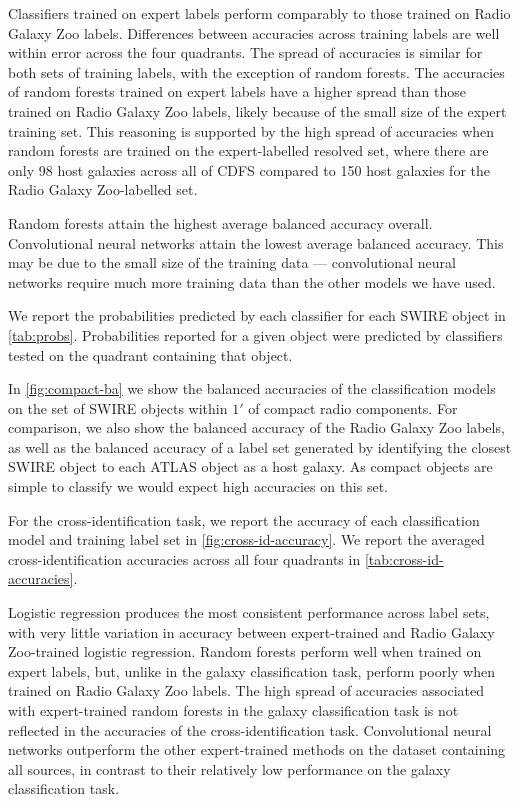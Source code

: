 \documentclass[fleqn,usenatbib,usedcolumn]{mnras}
\begin{document}
    Classifiers trained on expert labels perform comparably to those trained
    on Radio Galaxy Zoo labels. Differences between accuracies across training
    labels are well within error across the four quadrants. The spread of
    accuracies is similar for both sets of training labels, with the exception
    of random forests. The accuracies of random forests trained on expert
    labels have a higher spread than those trained on Radio Galaxy Zoo labels,
    likely because of the small size of the expert training set. This
    reasoning is supported by the high spread of accuracies when random
    forests are trained on the expert-labelled resolved set, where there are
    only 98 host galaxies across all of CDFS compared to 150 host galaxies for
    the Radio Galaxy Zoo-labelled set.

    Random forests attain the highest average balanced accuracy overall.
    Convolutional neural networks attain the lowest average balanced accuracy.
    This may be due to the small size of the training data --- convolutional
    neural networks require much more training data than the other models we
    have used.

    We report the probabilities predicted by each classifier for each SWIRE
    object in \autoref{tab:probs}. Probabilities reported for a given object
    were predicted by classifiers tested on the quadrant containing that
    object.

    In \autoref{fig:compact-ba} we show the balanced accuracies of the
    classification models on the set of SWIRE objects within $1'$ of compact
    radio components. For comparison, we also show the balanced accuracy of
    the Radio Galaxy Zoo labels, as well as the balanced accuracy of a label
    set generated by identifying the closest SWIRE object to each ATLAS object
    as a host galaxy. As compact objects are simple to classify we would
    expect high accuracies on this set.

    For the cross-identification task, we report the accuracy of each
    classification model and training label set in
    \autoref{fig:cross-id-accuracy}. We report the averaged
    cross-identification accuracies across all four quadrants in
    \autoref{tab:cross-id-accuracies}.

    Logistic regression produces the most consistent performance across label
    sets, with very little variation in accuracy between expert-trained and
    Radio Galaxy Zoo-trained logistic regression. Random forests perform well
    when trained on expert labels, but, unlike in the galaxy classification
    task, perform poorly when trained on Radio Galaxy Zoo labels. The high
    spread of accuracies associated with expert-trained random forests in the
    galaxy classification task is not reflected in the accuracies of the
    cross-identification task. Convolutional neural networks outperform the
    other expert-trained methods on the dataset containing all sources, in
    contrast to their relatively low performance on the galaxy classification
    task.
\end{document}
